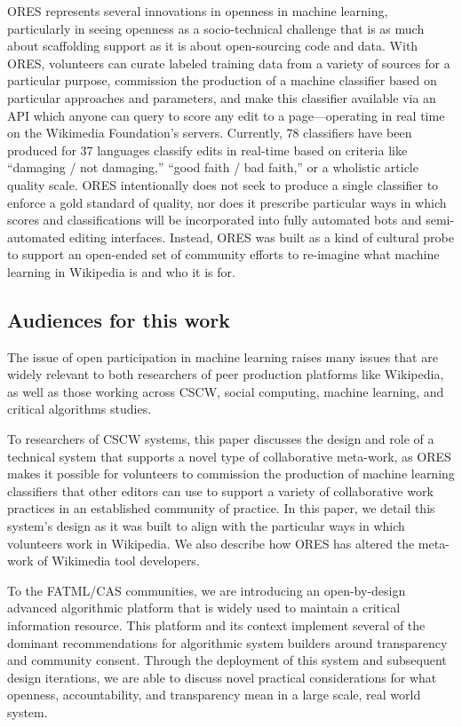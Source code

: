 ORES represents several innovations in openness in machine learning, particularly in seeing openness as a socio-technical challenge that is as much about scaffolding support as it is about open-sourcing code and data. With ORES, volunteers can curate labeled training data from a variety of sources for a particular purpose, commission the production of a machine classifier based on particular approaches and parameters, and make this classifier available via an API which anyone can query to score any edit to a page---operating in real time on the Wikimedia Foundation's servers. Currently, 78 classifiers have been produced for 37 languages classify edits in real-time based on criteria like ``damaging / not damaging,'' ``good faith / bad faith,'' or a wholistic article quality scale. ORES intentionally does not seek to produce a single classifier to enforce a gold standard of quality, nor does it prescribe particular ways in which scores and classifications will be incorporated into fully automated bots and semi-automated editing interfaces. Instead, ORES was built as a kind of cultural probe to support an open-ended set of community efforts to re-imagine what machine learning in Wikipedia is and who it is for.

\subsection{Audiences for this work}
The issue of open participation in machine learning raises many issues that are widely relevant to both researchers of peer production platforms like Wikipedia, as well as those working across CSCW, social computing, machine learning, and critical algorithms studies.

To researchers of CSCW systems, this paper discusses the design and role of a technical system that supports a novel type of collaborative meta-work, as ORES makes it possible for volunteers to commission the production of machine learning classifiers that other editors can use to support a variety of collaborative work practices in an established community of practice. In this paper, we detail this system's design as it was built to align with the particular ways in which volunteers work in Wikipedia. We also describe how ORES has altered the meta-work of Wikimedia tool developers.

To the FATML/CAS communities, we are introducing an open-by-design advanced algorithmic platform that is widely used to maintain a critical information resource.  This platform and its context implement several of the dominant recommendations for algorithmic system builders around transparency and community consent\cite{crawford2016algorithm,diakopoulos2015algorithmic,gillespie2014relevance,tufekci2015algorithms,sandvig2014auditing}.  Through the deployment of this system and subsequent design iterations, we are able to discuss novel practical considerations for what openness, accountability, and transparency mean in a large scale, real world system.

